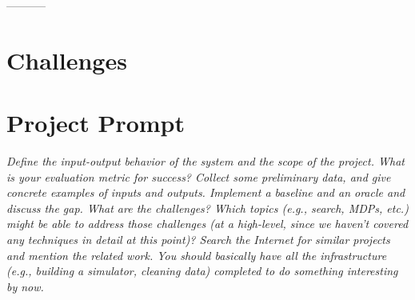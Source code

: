 \documentclass{article}
\begin{document}
-----------

\section*{Challenges} %



\section*{Project Prompt}

\textit{Define the input-output behavior of the system and the scope of the project. What is your evaluation metric for success? Collect some preliminary data, and give concrete examples of inputs and outputs. Implement a baseline and an oracle and discuss the gap. What are the challenges? Which topics (e.g., search, MDPs, etc.) might be able to address those challenges (at a high-level, since we haven't covered any techniques in detail at this point)? Search the Internet for similar projects and mention the related work. You should basically have all the infrastructure (e.g., building a simulator, cleaning data) completed to do something interesting by now.}
\end{document}
